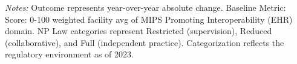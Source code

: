 \begin{table}[htbp]
    \centering
    \caption{Summary of Change in Facility Avg: MIPS PI by Authority and Year}
    \label{tab:d_fac_mips_pi_score}
    \vspace{0.2cm}
    \vspace{0.1cm}
    \begin{minipage}{\textwidth}
        \footnotesize \textit{Notes:} Outcome represents year-over-year absolute change. Baseline Metric: Score: 0-100 weighted facility avg of MIPS Promoting Interoperability (EHR) domain. NP Law categories represent Restricted (supervision), Reduced (collaborative), and Full (independent practice). Categorization reflects the regulatory environment as of 2023.
    \end{minipage}
\end{table}
